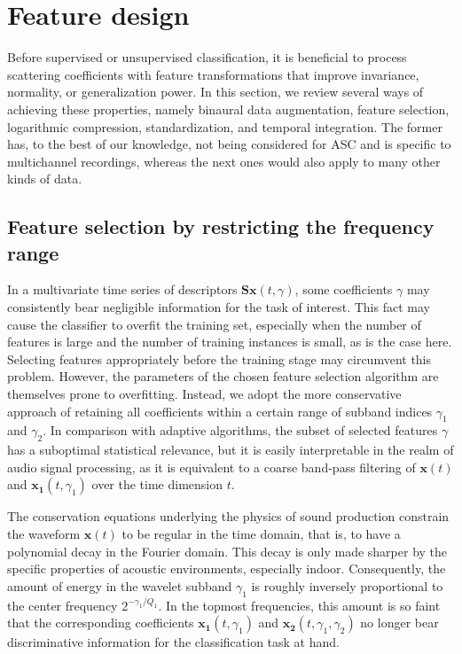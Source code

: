 \documentclass[journal]{IEEEtran}
\begin{document}
\section{Feature design}
Before supervised or unsupervised classification, it is beneficial to process scattering coefficients with feature transformations that improve invariance, normality, or generalization power. 
In this section, we review several ways of achieving these properties, namely binaural data augmentation, feature selection, logarithmic compression, standardization, and temporal integration.
The former has, to the best of our knowledge, not being considered for ASC and is specific to multichannel recordings, whereas the next ones would also apply to many other kinds of data.

\subsection{Feature selection by restricting the frequency range}
In a multivariate time series of descriptors $\mathbf{S}\boldsymbol{x}(t,\gamma)$, some coefficients $\gamma$ may consistently bear negligible information for the task of interest.
This fact may cause the classifier to overfit the training set, especially when the number of features is large and the number of training instances is small, as is the case here.
Selecting features appropriately before the training stage may circumvent this problem.
However, the parameters of the chosen feature selection algorithm are themselves prone to overfitting.
Instead, we adopt the more conservative approach of retaining all coefficients within a certain range of subband indices $\gamma_1$ and $\gamma_2$.
In comparison with adaptive algorithms, the subset of selected features $\gamma$ has a suboptimal statistical relevance, but it is easily interpretable in the realm of audio signal processing, as it is equivalent to a coarse band-pass filtering of $\boldsymbol{x}(t)$ and $\boldsymbol{x_1}(t,\gamma_1)$ over the time dimension $t$.

The conservation equations underlying the physics of sound production constrain the waveform $\boldsymbol{x}(t)$ to be regular in the time domain, that is, to have a polynomial decay in the Fourier domain.
This decay is only made sharper by the specific properties of acoustic environments, especially indoor.
Consequently, the amount of energy in the wavelet subband $\gamma_1$ is roughly inversely proportional to the center frequency $2^{-\gamma_1/Q_1}$.
In the topmost frequencies, this amount is so faint that the corresponding coefficients $\boldsymbol{x_1}(t,\gamma_1)$ and $\boldsymbol{x_2}(t,\gamma_1,\gamma_2)$ no longer bear discriminative information for the classification task at hand.
\end{document}
